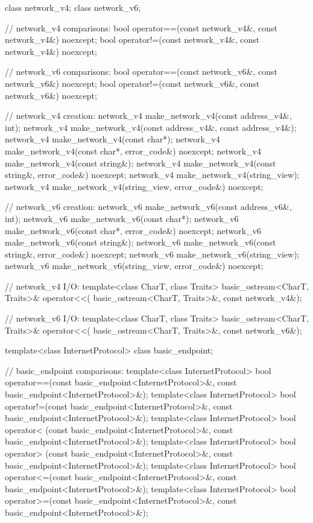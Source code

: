 \begin{codeblock}
{{{{{  class network_v4;
  class network_v6;

  // network_v4 comparisons:
  bool operator==(const network_v4&, const network_v4&) noexcept;
  bool operator!=(const network_v4&, const network_v4&) noexcept;

  // network_v6 comparisons:
  bool operator==(const network_v6&, const network_v6&) noexcept;
  bool operator!=(const network_v6&, const network_v6&) noexcept;

  // network_v4 creation:
  network_v4 make_network_v4(const address_v4&, int);
  network_v4 make_network_v4(const address_v4&, const address_v4&);
  network_v4 make_network_v4(const char*);
  network_v4 make_network_v4(const char*, error_code&) noexcept;
  network_v4 make_network_v4(const string&);
  network_v4 make_network_v4(const string&, error_code&) noexcept;
  network_v4 make_network_v4(string_view);
  network_v4 make_network_v4(string_view, error_code&) noexcept;

  // network_v6 creation:
  network_v6 make_network_v6(const address_v6&, int);
  network_v6 make_network_v6(const char*);
  network_v6 make_network_v6(const char*, error_code&) noexcept;
  network_v6 make_network_v6(const string&);
  network_v6 make_network_v6(const string&, error_code&) noexcept;
  network_v6 make_network_v6(string_view);
  network_v6 make_network_v6(string_view, error_code&) noexcept;

  // network_v4 I/O:
  template<class CharT, class Traits>
    basic_ostream<CharT, Traits>& operator<<(
      basic_ostream<CharT, Traits>&, const network_v4&);

  // network_v6 I/O:
  template<class CharT, class Traits>
    basic_ostream<CharT, Traits>& operator<<(
      basic_ostream<CharT, Traits>&, const network_v6&);

  template<class InternetProtocol>
    class basic_endpoint;

  // basic_endpoint comparisons:
  template<class InternetProtocol>
    bool operator==(const basic_endpoint<InternetProtocol>&,
                    const basic_endpoint<InternetProtocol>&);
  template<class InternetProtocol>
    bool operator!=(const basic_endpoint<InternetProtocol>&,
                    const basic_endpoint<InternetProtocol>&);
  template<class InternetProtocol>
    bool operator< (const basic_endpoint<InternetProtocol>&,
                    const basic_endpoint<InternetProtocol>&);
  template<class InternetProtocol>
    bool operator> (const basic_endpoint<InternetProtocol>&,
                    const basic_endpoint<InternetProtocol>&);
  template<class InternetProtocol>
    bool operator<=(const basic_endpoint<InternetProtocol>&,
                    const basic_endpoint<InternetProtocol>&);
  template<class InternetProtocol>
    bool operator>=(const basic_endpoint<InternetProtocol>&,
                    const basic_endpoint<InternetProtocol>&);

}}}}}
\end{codeblock}
